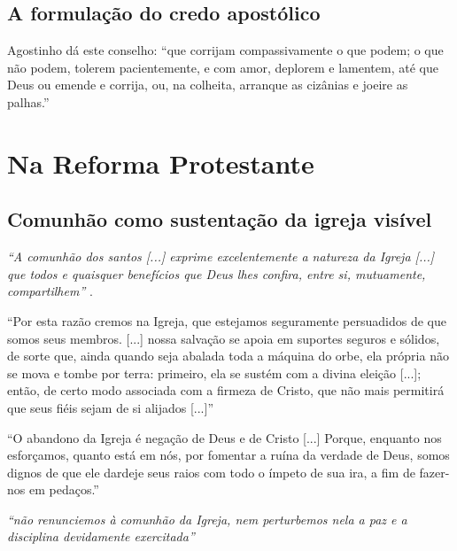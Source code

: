 \subsection{A formulação do credo apostólico}

\begin{citacao}
Agostinho dá este conselho: ``que corrijam compassivamente o que podem; o que não podem, tolerem pacientemente, e com amor, deplorem e lamentem, até que Deus ou emende e corrija, ou, na colheita, arranque as cizânias e joeire as palhas.'' \cite[v. 4, p. 102]{calvino2022}
\end{citacao}

\section{Na Reforma Protestante}

\subsection{Comunhão como sustentação da igreja visível}
\textit{``A comunhão dos santos [...] exprime excelentemente a natureza da Igreja [...] que todos e quaisquer benefícios que Deus lhes confira, entre si, mutuamente, compartilhem''} \cite[v. 4, p. 75-76]{calvino2022}.

\begin{citacao}
``Por esta razão cremos na Igreja, que estejamos seguramente persuadidos de que somos seus membros. [...] nossa salvação se apoia em suportes seguros e sólidos, de sorte que, ainda quando seja abalada toda a máquina do orbe, ela própria não se mova e tombe por terra: primeiro, ela se sustém com a divina eleição [...]; então, de certo modo associada com a firmeza de Cristo, que não mais permitirá que seus fiéis sejam de si alijados [...]'' \cite[v. 4, p. 75-76]{calvino2022}
\end{citacao}

\begin{citacao}
``O abandono da Igreja é negação de Deus e de Cristo [...] Porque, enquanto nos esforçamos, quanto está em nós, por fomentar a ruína da verdade de Deus, somos dignos de que ele dardeje seus raios com todo o ímpeto de sua ira, a fim de fazer-nos em pedaços.'' \cite[v. 4, p. 92]{calvino2022}
\end{citacao}

\textit{``não renunciemos à comunhão da Igreja, nem perturbemos nela a paz e a disciplina devidamente exercitada''} \cite[v. 4, p. 95]{calvino2022}

